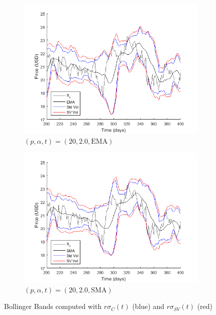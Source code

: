 \documentclass[11pt,a4,twosided,singlespacing,titlepagenumber=on]{scrreprt}
\numberwithin{equation}{chapter} %
\theoremstyle{remark}
\begin{document}
\begin{figure}[H]
    \centering
    \begin{subfigure}[t]{0.49\textwidth}
        \centering
        \includegraphics[width=1\textwidth]{model_vol/6}
        \caption{$(p, \alpha, t) = (20, 2.0,\text{EMA})$}
        \label{vol_mod_ema}
    \end{subfigure}
    \begin{subfigure}[t]{0.49\textwidth}
        \centering
        \includegraphics[width=1\textwidth]{model_vol/7}
        \caption{$(p, \alpha, t) = (20, 2.0,\text{SMA})$}
        \label{vol_mod_sma}
    \end{subfigure}
    \caption{Bollinger Bands computed with $r\sigma_C(t)$ (blue) and $r\sigma_{SV}(t)$ (red)}
    \label{fig:bollinger_bands_sma_ema}
\end{figure}
\end{document}
